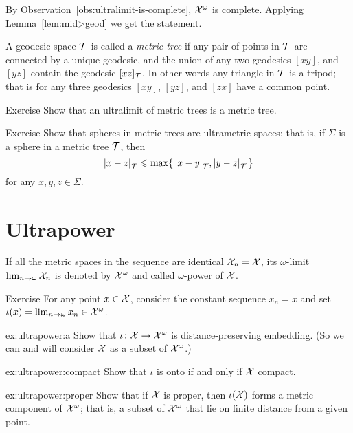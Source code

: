 By Observation~\ref{obs:ultralimit-is-complete}, $\mathcal{X}^\omega$ is complete.
Applying Lemma~\ref{lem:mid>geod} we get the statement.
\qeds

A geodesic space $\mathcal{T}$ is called a \emph{metric tree} if any pair of points in $\mathcal{T}$ are connected by a unique geodesic,
and the union of any two geodesics $[xy]$, and $[yz]$ contain the geodesic $[xz]_{\mathcal{T}}$.
In other words any triangle in $\mathcal{T}$ is a tripod;
that is for any three geodesics $[xy]$, $[yz]$, and $[zx]$ have a common point.

\begin{thm}{Exercise}\label{ex:lim(tree)}
Show that an ultralimit of metric trees is a metric tree. 
\end{thm}

\begin{thm}{Exercise}
Show that spheres in metric trees are ultrametric spaces;
that is, if $\Sigma$ is a sphere in a metric tree $\mathcal{T}$, then
\[\dist{x}{z}{\spc{T}}
\le
\max\{\,\dist{x}{y}{\spc{T}},\dist{y}{z}{\spc{T}}\,\}\]
for any $x,y,z\in\Sigma$.
\end{thm}



\section{Ultrapower}

If all the metric spaces in the sequence are identical $\mathcal{X}_n=\mathcal{X}$, 
its $\omega$-limit 
$\lim_{n\to\omega}\mathcal{X}_n$
is denoted by $\mathcal{X}^\omega$
and called $\omega$-power of $\mathcal{X}$.



\begin{thm}{Exercise}\label{ex:ultrapower}
For any point $x\in \mathcal{X}$, consider the constant sequence $x_n=x$
and set $\iota(x)=\lim_{n\to\omega}x_n\in\mathcal{X}^\omega$.

\begin{subthm}{ex:ultrapower:a}
Show that $\iota\colon\mathcal{X}\to\mathcal{X}^\omega$ is distance-preserving embedding. (So we can and will consider $\mathcal{X}$ as a subset of $\mathcal{X}^\omega$.)
\end{subthm}

\begin{subthm}{ex:ultrapower:compact} 
Show that $\iota$ is onto if and only if $\mathcal{X}$ compact.
\end{subthm}

\begin{subthm}{ex:ultrapower:proper} 
Show that if $\mathcal{X}$ is proper, then $\iota(\mathcal{X})$ forms a metric component of $\mathcal{X}^\omega$; that is, a subset of $\mathcal{X}^\omega$ that lie on finite distance from a given point.
\end{subthm}

\end{thm}


